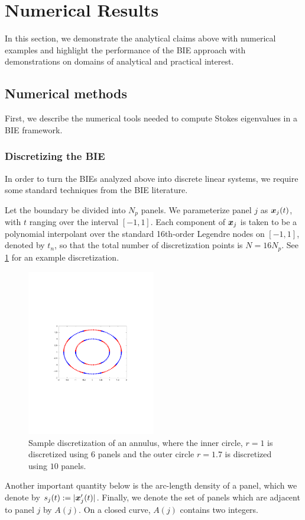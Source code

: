 \section{Numerical Results}
\label{sec:numerical}

In this section, we demonstrate the analytical
claims above with numerical examples and
highlight the performance of the BIE approach
with demonstrations on domains of analytical
and practical interest.

\subsection{Numerical methods}

First, we describe the numerical tools needed
to compute Stokes eigenvalues in a BIE
framework.

\subsubsection{Discretizing the BIE}

In order to turn the BIEs analyzed
above into discrete linear systems,
we require some standard techniques
from the BIE literature.

Let the boundary be divided into $N_p$
panels.
%
We parameterize panel $j$ as
${\boldsymbol x}_j(t)$, with $t$ ranging over the
interval $[-1,1]$.
%
Each component of ${\boldsymbol x}_j$ is taken to be
a polynomial interpolant over the
standard 16th-order Legendre nodes on
$[-1,1]$, denoted by $t_n$, so that
the total number of discretization
points is $N=16N_p$.
%
See \cref{fig:panels} for an example
discretization.

\begin{figure}
\centering
\includegraphics[width=0.5\textwidth]{media/annulus_discretization.pdf}
\caption{Sample discretization of an annulus, where the inner
circle, $r=1$ is discretized using $6$ panels and the outer circle $r=1.7$
is discretized using $10$ panels.}
\label{fig:panels}
\end{figure}
%
Another important quantity below is the
arc-length density of a panel, which
we denote by $s_j(t) := |{\boldsymbol x}'_j(t)|$.
%
Finally, we denote the set of panels
which are adjacent to panel $j$
by $A(j)$. On a closed curve,
$A(j)$ contains two integers.

